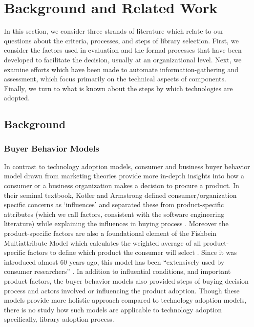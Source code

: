 
\section{Background and Related Work}

In this section, we consider three strands of literature which relate to our questions about the criteria, processes, and steps of library selection. First, we consider the factors used in evaluation and the formal processes that have been developed to facilitate the decision, usually at an organizational level. Next, we examine efforts which have been made to automate information-gathering and assessment, which focus primarily on the technical aspects of components. Finally, we turn to what is known about the steps by which technologies are adopted.


\subsection{Background}
\subsubsection{Buyer Behavior Models}
In contrast to technology adoption models, consumer and business buyer behavior model drawn from marketing theories provide more in-depth insights into how a consumer or a business organization makes a decision to procure a product. In their seminal textbook, Kotler and Armstrong defined consumer/organization specific concerns as `influences' and  separated these from product-specific attributes (which we call factors, consistent with the software engineering literature) while explaining the influences in buying process \cite{kotler2014principles}. Moreover the product-specific factors are also a foundational element of the Fishbein Multiattribute Model which calculates the weighted average of all product-specific factors to define which product the consumer will select \cite{fishbein1967attitude}. Since it was introduced almost 60 years ago, this model has been ``extensively used by consumer researchers'' \cite{blackwell2001consumer}. %
In addition to influential conditions, and important product factors, the buyer behavior models also provided steps of buying decision process and actors involved or influencing the product adoption. Though these models provide more holistic approach compared to technology adoption models, there is no study how such models are applicable to technology adoption specifically, library adoption process.

